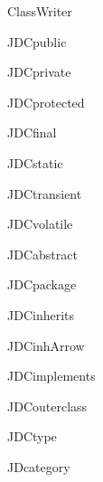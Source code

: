 \begin{jdclass}[class]{ClassWriter}
\begin{jdfield}{JDCpublic}
\jdprivate \jdfinal \jdstatic 
{}
\end{jdfield}
\begin{jdfield}{JDCprivate}
\jdprivate \jdfinal \jdstatic 
{}
\end{jdfield}
\begin{jdfield}{JDCprotected}
\jdprivate \jdfinal \jdstatic 
{}
\end{jdfield}
\begin{jdfield}{JDCfinal}
\jdprivate \jdfinal \jdstatic 
{}
\end{jdfield}
\begin{jdfield}{JDCstatic}
\jdprivate \jdfinal \jdstatic 
{}
\end{jdfield}
\begin{jdfield}{JDCtransient}
\jdprivate \jdfinal \jdstatic 
{}
\end{jdfield}
\begin{jdfield}{JDCvolatile}
\jdprivate \jdfinal \jdstatic 
{}
\end{jdfield}
\begin{jdfield}{JDCabstract}
\jdprivate \jdfinal \jdstatic 
{}
\end{jdfield}
\begin{jdfield}{JDCpackage}
\jdprivate \jdfinal \jdstatic 
{}
\end{jdfield}
\begin{jdfield}{JDCinherits}
\jdprivate \jdfinal \jdstatic 
{}
\end{jdfield}
\begin{jdfield}{JDCinhArrow}
\jdprivate \jdfinal \jdstatic 
{}
\end{jdfield}
\begin{jdfield}{JDCimplements}
\jdprivate \jdfinal \jdstatic 
{}
\end{jdfield}
\begin{jdfield}{JDCouterclass}
\jdprivate \jdfinal \jdstatic 
{}
\end{jdfield}
\begin{jdfield}{JDCtype}
\jdprivate \jdfinal \jdstatic 
{}
\end{jdfield}
\begin{jdfield}{JDcategory}
\jdprivate \jdfinal \jdstatic 

\end{jdfield}
\end{jdclass}
